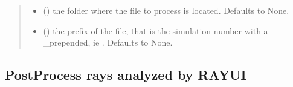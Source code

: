 \documentclass[letterpaper,10pt,english]{sphinxmanual}
\begin{document}
\begin{fulllineitems}
\begin{fulllineitems}
\begin{quote}
\begin{description}
\begin{itemize}
\item {} 
\sphinxAtStartPar
{} (\sphinxstyleliteralemphasis{\sphinxupquote{, }}) \textendash{} the folder where the file to process is located. Defaults to None.

\item {} 
\sphinxAtStartPar
{} (\sphinxstyleliteralemphasis{\sphinxupquote{, }}) \textendash{} the prefix of the file, that is the simulation number with a \_prepended, ie . Defaults to None.

\end{itemize}

\end{description}\end{quote}

\end{fulllineitems}


\end{fulllineitems}



\subsection{PostProcess rays analyzed by RAY\sphinxhyphen{}UI}
\label{\detokenize{code_documentation:postprocess-rays-analyzed-by-ray-ui}}
\end{document}

